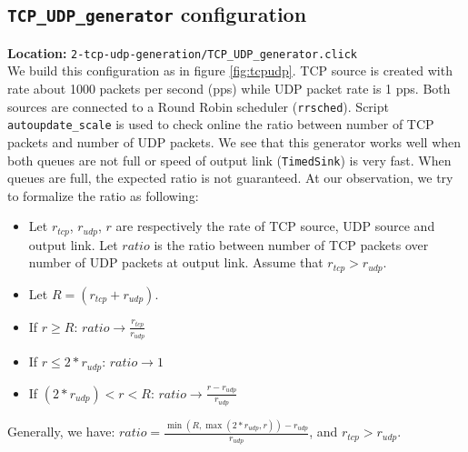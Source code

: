 \documentclass[a4paper]{article}
\begin{document}
  \subsection{\texttt{TCP\_UDP\_generator} configuration}
  \textbf{Location:} \texttt{2-tcp-udp-generation/TCP\_UDP\_generator.click} \\
  We build this configuration as in figure \ref{fig:tcpudp}. TCP source is created with rate about 1000 packets per second (pps) while UDP packet rate is 1 pps. Both sources are connected to a Round Robin scheduler (\texttt{rrsched}). Script \texttt{autoupdate\_scale} is used to check online the ratio between number of TCP packets and number of UDP packets. We see that this generator works well when both queues are not full or speed of output link (\texttt{TimedSink}) is very fast. When queues are full, the expected ratio is not guaranteed. At our observation, we try to formalize the ratio as following:
  \begin{itemize}
  	\item Let $r_{tcp}$, $r_{udp}$, $r$ are respectively the rate of TCP source, UDP source and output link. Let $ratio$ is the ratio between number of TCP packets over number of UDP packets at output link. Assume that $r_{tcp} > r_{udp}$.
  	\item Let $R = (r_{tcp} + r_{udp})$.
  	\item If $r \ge R$: $ratio \to \frac{r_{tcp}}{r_{udp}}$
  	\item If $r \le 2*r_{udp}$: $ratio \to 1$
  	\item If $ (2*r_{udp}) < r < R$: $ratio \to \frac{r - r_{udp}}{r_{udp}}$
  \end{itemize}
  Generally, we have: $ratio = \frac{\min(R, \max(2*r_{udp}, r)) - r_{udp}}{r_{udp}}$, and $r_{tcp} > r_{udp}$.
\end{document}
